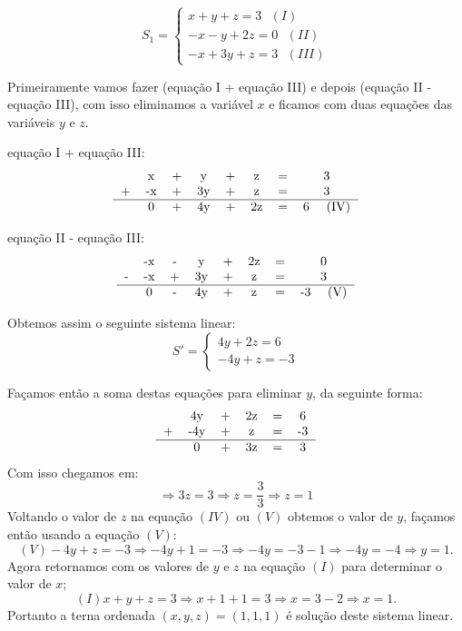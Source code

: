 \begin{exem}
 \[S_1= \begin{cases}
         x + y + z= 3 \ \ \ (I)\\
         -x - y + 2z= 0 \ \ \ (II)\\
         -x + 3y + z= 3 \ \ \ (III)
        \end{cases} \]

 Primeiramente vamos fazer (equação I + equação III) e depois (equação II - equação III), com isso eliminamos a variável $x$ e ficamos com duas equações das variáveis $y$ e $z$.

 equação I + equação III:
 \[\begin{tabular}{cccccccc}
   & x & +  & y & + & z & =  & 3  \\
 + & -x & + & 3y & + & z & = & 3 \\\hline
   & 0 & + & 4y & + & 2z & = & 6 \ \ \ (IV)\\
\end{tabular}\]

equação II - equação III:
\[\begin{tabular}{cccccccc}
   & -x & - & y & + & 2z & = & 0 \\
 - & -x & + & 3y & + & z & = & 3 \\\hline
   & 0 & - & 4y & + & z & = & -3 \ \ \ (V)\\
\end{tabular}\]

Obtemos assim o seguinte sistema linear:
\[S'= \begin{cases}
       4y + 2z = 6 \\
       -4y + z= -3
      \end{cases}\]

 Façamos então a soma destas equações para eliminar $y$, da seguinte forma:
 \[\begin{tabular}{cccccccc}
   & 4y & + & 2z & = & 6 \\
 + & -4y & + & z & = & -3 \\\hline
   & 0 & + & 3z & = & 3 \\
\end{tabular}\]
Com isso chegamos em:
\[\Rightarrow 3z= 3 \Rightarrow z= \frac{3}{3} \Rightarrow z= 1 \]
Voltando o valor de $z$ na equação $(IV)$ ou $(V)$ obtemos o valor de $y$, façamos então usando a equação $(V)$:
\[(V) -4y + z = -3 \Rightarrow -4y + 1 = -3 \Rightarrow -4y = -3 - 1 \Rightarrow -4y = -4 \Rightarrow y = 1.\]
Agora retornamos com os valores de $y$ e $z$ na equação $(I)$ para determinar o valor de $x$;
\[(I) x + y + z= 3 \Rightarrow x + 1 + 1 = 3 \Rightarrow x = 3 - 2 \Rightarrow x = 1.\]
Portanto a terna ordenada $(x, y, z)= (1, 1, 1)$ é solução deste sistema linear.
\fim

\end{exem}


